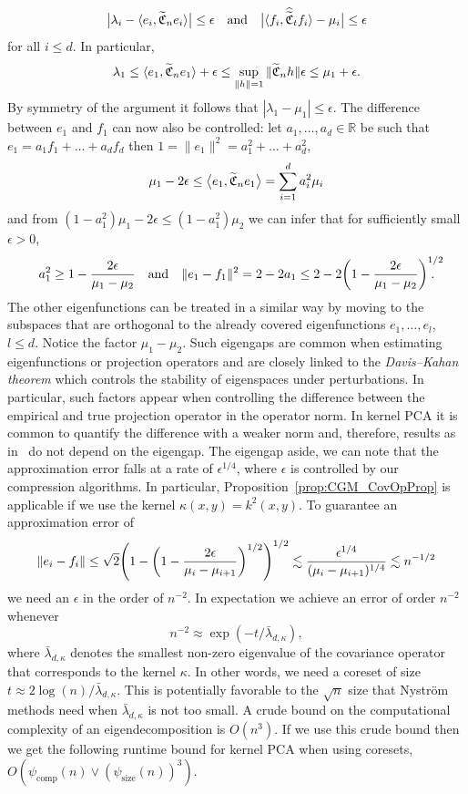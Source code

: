 \documentclass[10pt]{amsart}
\theoremstyle{definition}\newtheorem{defi}[theo]{Definition}\newtheorem{rema}[theo]{Remark}\newtheorem{exam}[theo]{Example}\newtheorem{exem}[theo]{Example}\newtheorem{nota}[theo]{Notation}
\theoremstyle{remark}
\newcommand{\compp}{\mathrm{comp}}
\newcommand{\ssize}{\mathrm{size}}
\newcommand{\R}{\mathbb{R}}
\newcommand{\fkC}{\mathfrak{C}}
\newcommand{\wh}{\widehat}
\let\oldtilde\tilde
\renewcommand*{\tilde}[1]{\mathchoice{\widetilde{#1}}{\widetilde{#1}}{\oldtilde{#1}}{\oldtilde{#1}}}
\let\originalleft\left
\let\originalright\right
\renewcommand{\left}{\mathopen{}\mathclose\bgroup\originalleft}
\renewcommand{\right}{\aftergroup\egroup\originalright}
\begin{document}
\[
\bigl|\lambda_i - \langle e_i, \tilde{\fkC}_n e_i \rangle\bigr| \leq \epsilon \quad\text{and}\quad \bigl|\langle f_i, \wh{\oldtilde{\fkC}}_t f_i \rangle - \mu_i\bigr| \leq \epsilon
\]
for all $i\leq d$. In particular,
\[
\lambda_1 \leq \langle e_1, \tilde{\fkC}_n e_1 \rangle + \epsilon \leq
\sup_{\|h\|=1} \|\tilde{\fkC}_n h\| \epsilon \leq \mu_1 +\epsilon.
\]
By symmetry of the argument it follows that $|\lambda_1 - \mu_1| \leq \epsilon$. The difference between $e_1$ and $f_1$ can now also be controlled: let $a_1,\dots, a_d \in \R$ be such that $ e_1 = a_1 f_1 + \dots + a_d f_d$ then $1 = \|e_1\|^2 = a_1^2 + \dots +a_d^2$,
\[
\mu_1 - 2\epsilon \leq \bigl\langle e_1, \tilde{\fkC}_n e_1 \bigr\rangle =
\sum_{i=1}^d a_i^2 \mu_i
\]
and from $(1-a_1^2) \mu_1 -2 \epsilon \leq (1-a_1^2) \mu_2$ we can infer that for sufficiently small $\epsilon >0$,
\[
a_1^2 \geq 1 - \frac{2 \epsilon}{\mu_1 - \mu_2} \quad\text{and}\quad
\|e_1 - f_1\|^2 = 2 - 2 a_1 \leq 2 -2 \left(1- \frac{2\epsilon}{\mu_1 - \mu_2}\right)^{1/2}\!\!\!\!\!\!.
\]
The other eigenfunctions can be treated in a similar way by moving to the subspaces that are orthogonal to the already covered eigenfunctions $e_1,\dots, e_l$, $l\leq d$. Notice the factor $\mu_1 - \mu_2$. Such eigengaps are common when estimating eigenfunctions or projection operators and are closely linked to the \emph{Davis--Kahan theorem} which controls the stability of eigenspaces under perturbations. In particular, such factors appear when controlling the difference between the empirical and true projection operator in the operator norm. In kernel PCA it is common to quantify the difference with a weaker norm and, therefore, results as in~\cite{STER20} do not depend on the eigengap. The eigengap aside, we can note that the approximation error falls at a rate of $\epsilon^{1/4}$, where $\epsilon$ is controlled by our compression algorithms. In particular, Proposition~\ref{prop:CGM_CovOpProp} is applicable if we use the kernel $\kappa(x,y) =k^2(x,y)$. To guarantee an approximation error of
\[
\|e_i - f_i\| \leq \sqrt{2}\left(1 - \left(1- \frac{2 \epsilon}{\mu_i - \mu_{i+1} } \right)^{1/2} \right)^{1/2} \lesssim \frac{\epsilon^{1/4}}{(\mu_i - \mu_{i+1})^{1/4}} \lesssim n^{-1/2}
\]
we need an $\epsilon$ in the order of $n^{-2}$. In expectation we achieve an error of order $n^{-2}$ whenever
\[
n^{-2} \approx \exp(-t/ \bar \lambda_{d,\kappa}),
\]
where $\bar \lambda_{d,\kappa}$ denotes the smallest non-zero eigenvalue of the covariance operator that corresponds to the kernel $\kappa$. In other words, we need a coreset of size $t \approx 2\log(n)/\bar \lambda_{d,\kappa}$. This is potentially favorable to the $\sqrt{n}$ size that Nystr\"om methods need when $\bar \lambda_{d,\kappa}$ is not too small. A crude bound on the computational complexity of an eigendecomposition is $O(n^3)$. If we use this crude bound then we get the following runtime bound for kernel PCA when using coresets, $O(\psi_{\compp}(n) \vee (\psi_{\ssize}(n))^3)$.
\end{document}
